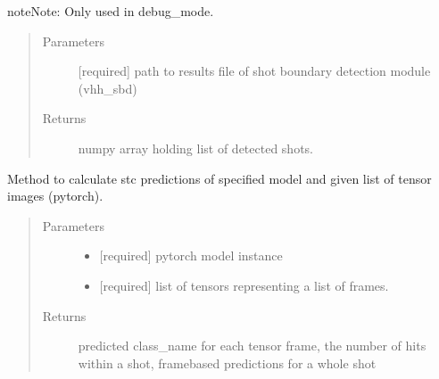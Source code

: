 \documentclass[letterpaper,10pt,english,openany,oneside]{sphinxmanual}
\begin{document}
\begin{fulllineitems}
\begin{fulllineitems}
\begin{sphinxadmonition}{note}{Note:}
Only used in debug\_mode.
\end{sphinxadmonition}
\begin{quote}\begin{description}
\item[{Parameters}] \leavevmode
{} \textendash{} {[}required{]} path to results file of shot boundary detection module (vhh\_sbd)

\item[{Returns}] \leavevmode
numpy array holding list of detected shots.

\end{description}\end{quote}

\end{fulllineitems}


\begin{fulllineitems}
\label{\detokenize{STC:stc.STC.STC.runModel}}
Method to calculate stc predictions of specified model and given list of tensor images (pytorch).
\begin{quote}\begin{description}
\item[{Parameters}] \leavevmode\begin{itemize}
\item {} 
 \textendash{} {[}required{]} pytorch model instance

\item {} 
 \textendash{} {[}required{]} list of tensors representing a list of frames.

\end{itemize}

\item[{Returns}] \leavevmode
predicted class\_name for each tensor frame,
the number of hits within a shot,
frame\sphinxhyphen{}based predictions for a whole shot

\end{description}\end{quote}

\end{fulllineitems}


\end{fulllineitems}
\end{document}
